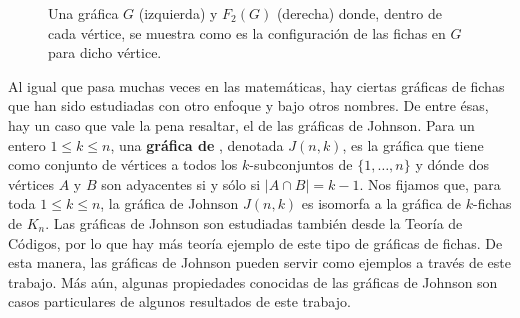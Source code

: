 \begin{figure}[ht!]
    \caption{Una gr\'afica $G$ (izquierda) y $F_2(G)$ (derecha) donde, dentro de
    cada v\'ertice, se muestra como es la configuraci\'on de las fichas en $G$
    para dicho v\'ertice.}
    \label{fig:ex-tok-graph}
\end{figure}

Al igual que pasa muchas veces en las matem\'aticas, hay ciertas gr\'aficas de
fichas que han sido estudiadas con otro enfoque y bajo otros nombres. De entre
\'esas, hay un caso que vale la pena resaltar, el de las gr\'aficas de Johnson.
Para un entero $1 \leq k \leq n$, una \textbf{gr\'afica de}
, denotada $J(n,k)$, es la gr\'afica que tiene
como conjunto de v\'ertices a todos los $k$-subconjuntos de $\{1, \dots, n\}$ y
d\'onde dos v\'ertices $A$ y $B$ son adyacentes si y s\'olo si $|A \cap B| =
k-1$. Nos fijamos que, para toda $1 \leq k \leq n$, la gr\'afica de Johnson
$J(n,k)$ es isomorfa a la gr\'afica de $k$-fichas de $K_n$. Las gr\'aficas de
Johnson son estudiadas tambi\'en desde la Teor\'ia de C\'odigos, por lo que hay
m\'as teor\'ia ejemplo de este tipo de gr\'aficas de fichas. De esta manera, las
gr\'aficas de Johnson pueden servir como ejemplos a trav\'es de este trabajo.
M\'as a\'un, algunas propiedades conocidas de las gr\'aficas de Johnson son
casos particulares de algunos resultados de este trabajo.

